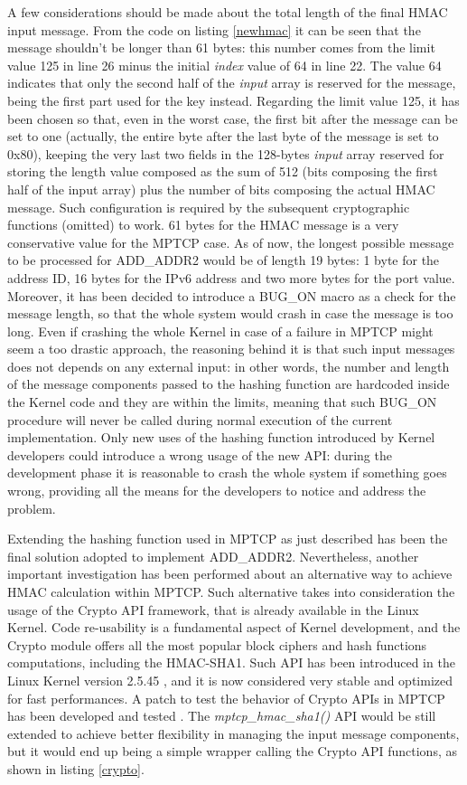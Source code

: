 A few considerations should be made about the total length of the final HMAC input message. From the code on listing \ref{newhmac} it can be seen that the message shouldn't be longer than 61 bytes: this number comes from the limit value 125 in line 26 minus the initial \textit{index} value of 64 in line 22. The value 64 indicates that only the second half of the \textit{input} array is reserved for the message, being the first part used for the key instead. Regarding the limit value 125, it has been chosen so that, even in the worst case, the first bit after the message can be set to one (actually, the entire byte after the last byte of the message is set to 0x80), keeping the very last two fields in the 128-bytes \textit{input} array reserved for storing the length value composed as the sum of 512 (bits composing the first half of the input array) plus the number of bits composing the actual HMAC message. Such configuration is required by the subsequent cryptographic functions (omitted) to work. 
61 bytes for the HMAC message is a very conservative value for the MPTCP case. As of now, the longest possible message to be processed for ADD\_ADDR2 would be of length 19 bytes: 1 byte for the address ID, 16 bytes for the IPv6 address and two more bytes for the port value.
Moreover, it has been decided to introduce a BUG\_ON macro as a check for the message length, so that the whole system would crash in case the message is too long. Even if crashing the whole Kernel in case of a failure in MPTCP might seem a too drastic approach, the reasoning behind it is that such input messages does not depends on any external input: in other words, the number and length of the message components passed to the hashing function are hardcoded inside the Kernel code and they are within the limits, meaning that such BUG\_ON procedure will never be called during normal execution of the current implementation. Only new uses of the hashing function introduced by Kernel developers could introduce a wrong usage of the new API: during the development phase it is reasonable to crash the whole system if something goes wrong, providing all the means for the developers to notice and address the problem.

Extending the hashing function used in MPTCP as just described has been the final solution adopted to implement ADD\_ADDR2. Nevertheless, another important investigation has been performed about an alternative way to achieve HMAC calculation within MPTCP. Such alternative takes into consideration the usage of the Crypto API framework, that is already available in the Linux Kernel. Code re-usability is a fundamental aspect of Kernel development, and the Crypto module offers all the most popular block ciphers and hash functions computations, including the HMAC-SHA1. Such API has been introduced in the Linux Kernel version 2.5.45 \cite{cryptoinkernel}, and it is now considered very stable and optimized for fast performances. 
A patch to test the behavior of Crypto APIs in MPTCP has been developed and tested \cite{cryptopatch1} \cite{cryptopatch2}. The \textit{mptcp\_hmac\_sha1()} API would be still extended to achieve better flexibility in managing the input message components, but it would end up being a simple wrapper calling the Crypto API functions, as shown in listing \ref{crypto}.

